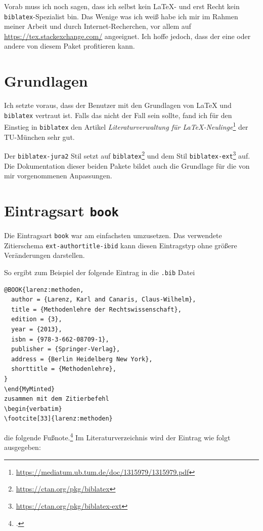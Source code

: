 \documentclass[headings=small,numbers=noenddot, 12pt,oneside]{scrartcl}
\newcommand\fnurl[1]{\footnote{\url{#1}}}
\newenvironment{MyMinted}{\VerbatimEnvironment\begin{verbatim}}{\end{verbatim}}
\begin{document}
Vorab muss ich noch sagen, dass ich selbst kein \LaTeX{}- und erst Recht kein \texttt{biblatex}-Spezialist bin. Das Wenige was ich weiß habe ich mir im Rahmen meiner Arbeit und durch Internet-Recherchen, vor allem auf \url{https://tex.stackexchange.com/} angeeignet. Ich hoffe jedoch, dass der eine oder andere von diesem Paket profitieren kann.

\section{Grundlagen}

Ich setzte voraus, dass der Benutzer mit den Grundlagen von \LaTeX{} und \texttt{biblatex} vertraut ist. Falls das nicht der Fall sein sollte, fand ich für den Einstieg in \texttt{biblatex} den Artikel \emph{Literaturverwaltung für \LaTeX{}-Neulinge}\fnurl{https://mediatum.ub.tum.de/doc/1315979/1315979.pdf} der TU-München sehr gut. 

Der \texttt{biblatex-jura2} Stil setzt auf \texttt{biblatex}\fnurl{https://ctan.org/pkg/biblatex} und dem Stil \texttt{biblatex-ext}\fnurl{https://ctan.org/pkg/biblatex-ext} auf. Die Dokumentation dieser beiden Pakete bildet auch die Grundlage für die von mir vorgenommenen Anpassungen.


\section{Eintragsart \texttt{book}}

Die Eintragsart \texttt{book} war am einfachsten umzusetzen. Das verwendete Zitierschema \texttt{ext-authortitle-ibid} kann diesen Eintragstyp ohne größere Veränderungen darstellen.

So ergibt zum Beispiel der folgende Eintrag in die \texttt{.bib} Datei
\begin{MyMinted}
@BOOK{larenz:methoden,
  author = {Larenz, Karl and Canaris, Claus-Wilhelm},
  title = {Methodenlehre der Rechtswissenschaft},
  edition = {3},
  year = {2013},
  isbn = {978-3-662-08709-1},
  publisher = {Springer-Verlag},
  address = {Berlin Heidelberg New York},
  shorttitle = {Methodenlehre},
}
\end{MyMinted}
zusammen mit dem Zitierbefehl
\begin{verbatim}
\footcite[33]{larenz:methoden}
\end{verbatim}
die folgende Fußnote.\footcite[33]{larenz:methoden} Im Literaturverzeichnis wird der Eintrag wie folgt ausgegeben: 
\printbibliography[heading=subbibliography, keyword={book:1}]
\end{document}
